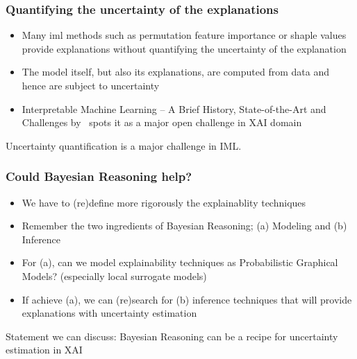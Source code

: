 \begin{frame}
  \frametitle{Quantifying the uncertainty of the explanations}
  \begin{itemize}
    \item Many iml methods such as permutation feature importance or
    shaple values provide explanations without quantifying the
    uncertainty of the explanation
    \item The model itself, but also its
    explanations, are computed from data and hence are subject to
    uncertainty
  \item Interpretable Machine Learning – A Brief History,
    State-of-the-Art and Challenges by~\cite{molnar2020interpretable}
  spots it as a major open challenge in XAI domain
\end{itemize}
  \noindent\makebox[\linewidth]{\rule{\paperwidth}{0.4pt}}
  Uncertainty quantification is a major challenge in IML.
\end{frame}

\begin{frame}
  \frametitle{Could Bayesian Reasoning help?}
  \begin{itemize}
  \item We have to (re)define more rigorously the explainablity
    techniques
  \item Remember the two ingredients of Bayesian Reasoning; (a) Modeling
    and (b) Inference
  \item For (a), can we model explainability techniques as
    Probabilistic Graphical Models? (especially local surrogate models)
  \item If achieve (a), we can (re)search for (b) inference techniques
    that will provide explanations with uncertainty estimation
  \end{itemize}
  \noindent\makebox[\linewidth]{\rule{\paperwidth}{0.4pt}}
  Statement we can discuss: Bayesian Reasoning can be a recipe for
  uncertainty estimation in XAI

\end{frame}


